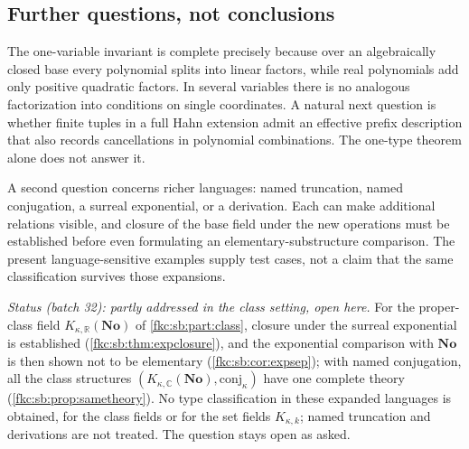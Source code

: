 \documentclass[11pt,letterpaper]{article}
\numberwithin{equation}{section}
\theoremstyle{definition}
\theoremstyle{remark}
\newcommand{\R}{\mathbb R}
\newcommand{\C}{\mathbb C}
\newcommand{\No}{\mathbf{No}}
\newcommand{\K}{K_{\kappa,k}}
\newcommand{\conj}{\mathrm{conj}}
\newcommand{\KN}[2]{K_{#1,#2}(\No)}%
\begin{document}
\subsection{Further questions, not conclusions}
The one-variable invariant is complete precisely because over an algebraically closed base every polynomial splits into linear factors, while real polynomials add only positive quadratic factors. In several variables there is no analogous factorization into conditions on single coordinates. A natural next question is whether finite tuples in a full Hahn extension admit an effective prefix description that also records cancellations in polynomial combinations. The one-type theorem alone does not answer it.

A second question concerns richer languages: named truncation, named conjugation, a surreal exponential, or a derivation. Each can make additional relations visible, and closure of the base field under the new operations must be established before even formulating an elementary-substructure comparison. The present language-sensitive examples supply test cases, not a claim that the same classification survives those expansions.

\emph{Status (batch 32): partly addressed in the class setting, open here.} For the proper-class field $\KN\kappa\R$ of \cref{fkc:sb:part:class}, closure under the surreal exponential is established (\cref{fkc:sb:thm:expclosure}), and the exponential comparison with $\No$ is then shown not to be elementary (\cref{fkc:sb:cor:expsep}); with named conjugation, all the class structures $(\KN\kappa\C,\conj_\kappa)$ have one complete theory (\cref{fkc:sb:prop:sametheory}). No type classification in these expanded languages is obtained, for the class fields or for the set fields $\K$; named truncation and derivations are not treated. The question stays open as asked.
\end{document}
